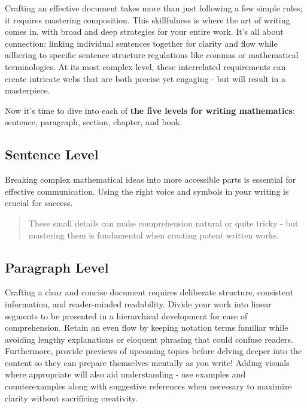 \documentclass[
  twoside,
  12pt,
  letterpaper,
  fleqn]{article}
\begin{document}
Crafting an effective document takes more than just following a few
simple rules; it requires mastering composition. This skillfulness is
where the art of writing comes in, with broad and deep strategies for
your entire work. It's all about connection: linking individual
sentences together for clarity and flow while adhering to specific
sentence structure regulations like commas or mathematical
terminologies. At its most complex level, these interrelated
requirements can create intricate webs that are both precise yet
engaging - but will result in a masterpiece.

Now it's time to dive into each of \textbf{the five levels for writing
mathematics}: sentence, paragraph, section, chapter, and book.

\hypertarget{sentence-level}{%
\subsection{Sentence Level}\label{sentence-level}}

Breaking complex mathematical ideas into more accessible parts is
essential for effective communication. Using the right voice and symbols
in your writing is crucial for success.

\begin{quote}
These small details can make comprehension natural or quite tricky - but
mastering them is fundamental when creating potent written works.
\end{quote}

\hypertarget{paragraph-level}{%
\subsection{Paragraph Level}\label{paragraph-level}}

Crafting a clear and concise document requires deliberate structure,
consistent information, and reader-minded readability. Divide your work
into linear segments to be presented in a hierarchical development for
ease of comprehension. Retain an even flow by keeping notation terms
familiar while avoiding lengthy explanations or eloquent phrasing that
could confuse readers. Furthermore, provide previews of upcoming topics
before delving deeper into the content so they can prepare themselves
mentally as you write! Adding visuals where appropriate will also aid
understanding - use examples and counterexamples along with suggestive
references when necessary to maximize clarity without sacrificing
creativity.
\end{document}

